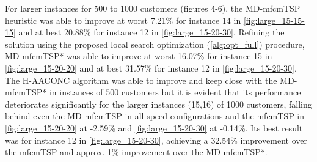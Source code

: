 \documentclass{article}
\begin{document}
	\par
	For larger instances for 500 to 1000 customers (figures 4-6), the MD-mfcmTSP heuristic was able to improve at worst 7.21\% for instance 14 in \autoref{fig:large_15-15-15} and at best 20.88\% for instance 12 in \autoref{fig:large_15-20-30}. Refining the solution using the proposed local search optimization (\autoref{alg:opt_full}) procedure, MD-mfcmTSP* was able to improve at worst 16.07\% for instance 15 in \autoref{fig:large_15-20-20} and at best 31.57\% for instance 12 in \autoref{fig:large_15-20-30}. The H-AACONC algorithm was able to improve and keep close with the MD-mfcmTSP* in instances of 500 customers but it is evident that its performance deteriorates significantly for the larger instances (15,16) of 1000 customers, falling behind even the MD-mfcmTSP in all speed configurations and the mfcmTSP in \autoref{fig:large_15-20-20} at -2.59\% and \ref{fig:large_15-20-30} at -0.14\%. Its best result was for instance 12 in \autoref{fig:large_15-20-30}, achieving a 32.54\% improvement over the mfcmTSP and approx. 1\% improvement over the MD-mfcmTSP*.
	\par 
	
\end{document}
